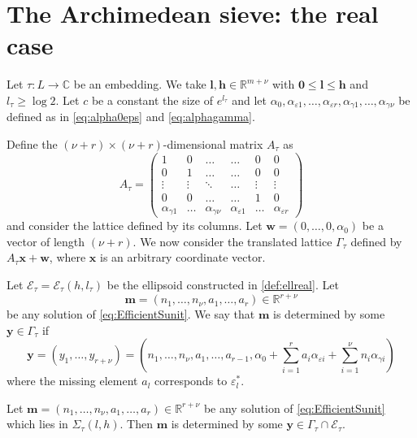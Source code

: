 
\section{The Archimedean sieve: the real case}
\label{sec:archsieve}

Let $\tau:L\to\mathbb{C}$ be an embedding. We take $\mathbf{l},\mathbf{h} \in \mathbb{R}^{m+\nu}$ with $\mathbf{0}\leq \mathbf{l}\leq \mathbf{h}$ and $l_\tau\geq \log 2$. Let $c$ be a constant the size of $e^{l_\tau}$ and let $\alpha_0, \alpha_{\varepsilon 1}, \dots, \alpha_{\varepsilon {r}}, \alpha_{\gamma 1}, \dots, \alpha_{\gamma {\nu}}$ be defined as in \eqref{eq:alpha0eps} and \eqref{eq:alphagamma}. 

Define the $(\nu+r) \times (\nu +r)$-dimensional matrix $A_{\tau}$ as
\[A_{\tau} = \begin{pmatrix}
	1 & 0 & \dots &  \dots & 0 & 0\\ 
	0 & 1	& \dots & \dots & 0 & 0\\
	\vdots & \vdots & \ddots & \dots & \vdots & \vdots \\ 
	0 & 0 & \dots &  \dots & 1 & 0\\ 
	\alpha_{\gamma 1} & \dots &\alpha_{\gamma {\nu}} & \alpha_{\varepsilon 1} & \dots & \alpha_{\varepsilon {r}}
\end{pmatrix}\]
and consider the lattice defined by its columns. Let $\mathbf{w} = (0,\dotsc,0,\alpha_0)$ be a vector of length $(\nu + r)$. We now consider the translated lattice $\Gamma_{\tau}$ defined by $A_{\tau}\mathbf{x} + \mathbf{w}$, where $\mathbf{x}$ is an arbitrary coordinate vector. 
 
Let $\mathcal E_{\tau}=\mathcal E_{\tau}(h,l_{\tau})$ be the ellipsoid constructed in \eqref{def:ellreal}. Let 
\[\mathbf{m} = (n_1, \dots, n_{\nu}, a_1, \dots, a_r) \in \mathbb{R}^{r + \nu}\]
be any solution of \eqref{eq:EfficientSunit}. We say that $\mathbf{m}$ is determined by some $\mathbf{y} \in \Gamma_{\tau}$ if 
\[\mathbf{y} = (y_1, \dots, y_{r+ \nu}) = \left(n_1, \dots, n_{\nu}, a_1, \dots, a_{r-1}, \alpha_0+\sum_{i = 1}^r a_i \alpha_{\varepsilon i} + \sum_{i = 1}^{\nu} n_i \alpha_{\gamma i}\right)\]
where the missing element $a_{l}$ corresponds to $\varepsilon_l^*$.

\begin{lemma}\label{lem:archsieve}
Let ${\mathbf{m} = (n_1, \dots, n_{\nu}, a_1, \dots, a_r) \in \mathbb{R}^{r + \nu}}$ be any solution of \eqref{eq:EfficientSunit} which lies in $\Sigma_\tau(l,h)$. Then $\mathbf{m}$ is determined by some $\mathbf{y}\in \Gamma_\tau\cap\mathcal E_\tau.$
\end{lemma}

